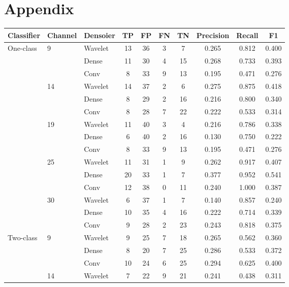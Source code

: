 \documentclass[ %
                    author={Rzan Alkabier},
                    supervisor={Dr. Zahraa Abdallah},
                    degree={MSc},
                     title={Denoising Extracellular Recording for Spike Detection and Classification on Single Channels},
                    subtitle={Does denoising improve detection and classification performance?},
                      type={},
                      year={2026}]{dissertation}
\begin{document}
\chapter{Appendix}
\label{appx:Appendix}
\begin{table}[htbp]
    \centering
    \begin{tabular}{lllccccccc}
    Classifier & Channel & Densoier & TP & FP & FN & TN & Precision & Recall & F1 \\
    \midrule
    \multirow{15}{*}{One-class}
    & \multirow{3}{*}{9} & Wavelet & 13 & 36 & 3 & 7  & 0.265 & 0.812 & 0.400 \\
    & & Dense & 11 & 30 & 4 & 15 & 0.268 & 0.733 & 0.393 \\
    & & Conv & 8 & 33 & 9 & 13 & 0.195 & 0.471 & 0.276 \\
    \cmidrule{2-10}
    & \multirow{3}{*}{14} & Wavelet & 14 & 37 & 2 & 6  & 0.275 & 0.875 & 0.418 \\
     & & Dense & 8 & 29 & 2 & 16 & 0.216 & 0.800 & 0.340 \\
     & & Conv & 8 & 28 & 7 & 22 & 0.222 & 0.533 & 0.314 \\
    \cmidrule{2-10}
     & \multirow{3}{*}{19} & Wavelet & 11 & 40 & 3 & 4  & 0.216 & 0.786 & 0.338 \\
     & & Dense & 6 & 40 & 2 & 16 & 0.130 & 0.750 & 0.222 \\
     & & Conv & 8 & 33 & 9 & 13 & 0.195 & 0.471 & 0.276 \\
     \cmidrule{2-10}
     & \multirow{3}{*}{25} & Wavelet & 11 & 31 & 1 & 9  & 0.262 & 0.917 & 0.407 \\
     & & Dense & 20 & 33 & 1 & 7 & 0.377 & 0.952 & 0.541 \\
     & & Conv & 12 & 38 & 0 & 11 & 0.240 & 1.000 & 0.387 \\
    \cmidrule{2-10}
     & \multirow{3}{*}{30} & Wavelet & 6  & 37 & 1 & 7  & 0.140 & 0.857 & 0.240 \\
     & & Dense & 10 & 35 & 4 & 16 & 0.222 & 0.714 & 0.339 \\
     & & Conv & 9 & 28 & 2 & 23 & 0.243 & 0.818 & 0.375 \\
    \midrule
    \multirow{15}{*}{Two-class}
     & \multirow{3}{*}{9} & Wavelet & 9  & 25 & 7 & 18 & 0.265 & 0.562 & 0.360 \\
     & & Dense & 8  & 20 & 7 & 25 & 0.286 & 0.533 & 0.372 \\
     & & Conv & 10 & 24 & 6 & 25 & 0.294 & 0.625 & 0.400 \\
    \cmidrule{2-10}
     & \multirow{3}{*}{14} & Wavelet & 7  & 22 & 9 & 21 & 0.241 & 0.438 & 0.311 \\

\end{tabular}
\end{table}
\end{document}
